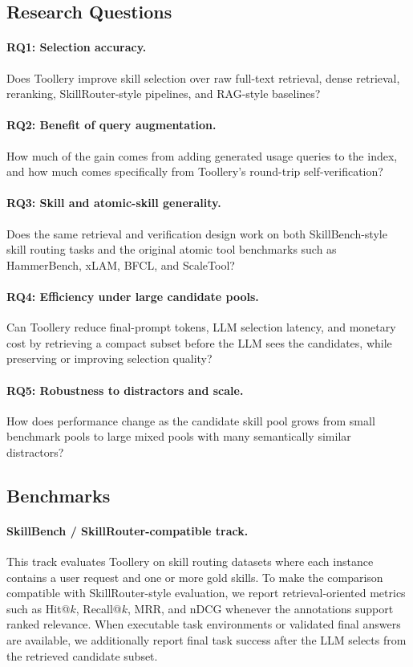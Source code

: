 \documentclass[11pt]{article}
\begin{document}
\subsection{Research Questions}
\label{subsec:rq}

\paragraph{RQ1: Selection accuracy.}
Does Toollery improve skill selection over raw full-text retrieval, dense
retrieval, reranking, SkillRouter-style pipelines, and RAG-style baselines?

\paragraph{RQ2: Benefit of query augmentation.}
How much of the gain comes from adding generated usage queries to the index, and
how much comes specifically from Toollery's round-trip self-verification?

\paragraph{RQ3: Skill and atomic-skill generality.}
Does the same retrieval and verification design work on both SkillBench-style
skill routing tasks and the original atomic tool benchmarks such as HammerBench,
xLAM, BFCL, and ScaleTool?

\paragraph{RQ4: Efficiency under large candidate pools.}
Can Toollery reduce final-prompt tokens, LLM selection latency, and monetary cost
by retrieving a compact subset before the LLM sees the candidates, while
preserving or improving selection quality?

\paragraph{RQ5: Robustness to distractors and scale.}
How does performance change as the candidate skill pool grows from small
benchmark pools to large mixed pools with many semantically similar distractors?

\subsection{Benchmarks}
\label{subsec:benchmarks}

\paragraph{SkillBench / SkillRouter-compatible track.}
This track evaluates Toollery on skill routing datasets where each instance
contains a user request and one or more gold skills. To make the comparison
compatible with SkillRouter-style evaluation, we report retrieval-oriented
metrics such as Hit@$k$, Recall@$k$, MRR, and nDCG whenever the annotations
support ranked relevance. When executable task environments or validated final
answers are available, we additionally report final task success after the LLM
selects from the retrieved candidate subset.
\end{document}
